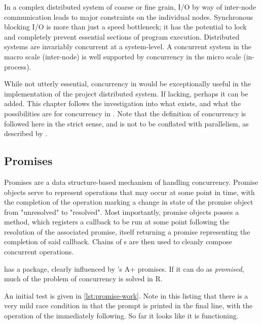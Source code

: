 
In a complex distributed system of coarse or fine grain, I/O by way of inter-node communication leads to major constraints on the individual nodes.
Synchronous blocking I/O is more than just a speed bottleneck; it has the potential to lock and completely prevent essential sections of program execution.
Distributed systems are invariably concurrent at a system-level.
A concurrent system in the macro scale (inter-node) is well supported by concurrency in the micro scale (in-process).

While not utterly essential, concurrency in \R{} would be exceptionally useful in the implementation of the project distributed system.
If lacking, perhaps it can be added.
This chapter follows the investigation into what exists, and what the possibilities are for concurrency in \R{}.
Note that the definition of concurrency is followed here in the strict sense, and is not to be conflated with parallelism, as described by \textcite{pike2012concurrency}.

\subsection{Promises}\label{subsec:promises}

Promises are a data structure-based mechanism of handling concurrency\cite{liskov1988promises}.
Promise objects serve to represent operations that may occur at some point in time, with the completion of the operation marking a change in state of the promise object from "unresolved" to "resolved".
Most importantly, promise objects posses a  method, which registers a callback to be run at some point following the resolution of the associated promise, itself returning a promise representing the completion of said callback.
Chains of s are then used to cleanly compose concurrent operations.

\R{} has a  package, clearly influenced by 's A+ promises\cite{cheng2021promises}.
If it can do as \textit{promised}, much of the problem of concurrency is solved in R.

An initial test is given in \cref{lst:promise-work}.
Note in this listing that there is a very mild race condition in that the prompt is printed in the final line, with the operation of the  immediately following.
So far it looks like it is functioning.


